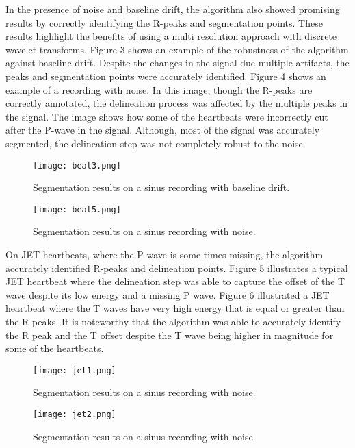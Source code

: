 \documentclass[conference,compsoc]{IEEEtran}
\begin{document}
In the presence of noise and baseline drift, the algorithm also showed promising results by correctly identifying the R-peaks and segmentation points. These results highlight the benefits of using a multi resolution approach with discrete wavelet transforms. Figure 3 shows an example of the robustness of the algorithm against baseline drift. Despite the changes in the signal due multiple artifacts, the peaks and segmentation points were accurately identified. Figure 4 shows an example of a recording with noise. In this image, though the R-peaks are correctly annotated, the delineation process was affected by the multiple peaks in the signal. The image shows how some of the heartbeats were incorrectly cut after the P-wave in the signal. Although, most of the signal was accurately segmented, the delineation step was not completely robust to the noise. 

\begin{figure}[h]
\centering
\texttt{[image: beat3.png]}
\caption{Segmentation results on a sinus recording with baseline drift. }
\label{fig_sim}
\end{figure}
\begin{figure}[h]
\centering
\texttt{[image: beat5.png]}
\caption{Segmentation results on a sinus recording with noise. }
\label{fig_sim}
\end{figure}

On JET heartbeats, where the P-wave is some times missing, the algorithm accurately identified R-peaks and delineation points. Figure 5 illustrates a typical JET heartbeat where the delineation step was able to capture the offset of the T wave despite its low energy and a missing P wave. Figure 6 illustrated a JET heartbeat where the T waves have very high energy that is equal or greater than the R peaks. It is noteworthy that the algorithm was able to accurately identify the R peak and the T offset despite the T wave being higher in magnitude for some of the heartbeats. 

\begin{figure}[h]
\centering
\texttt{[image: jet1.png]}
\caption{Segmentation results on a sinus recording with noise. }
\label{fig_sim}
\end{figure}

\begin{figure}[h]
\centering
\texttt{[image: jet2.png]}
\caption{Segmentation results on a sinus recording with noise. }
\label{fig_sim}
\end{figure}
\end{document}
